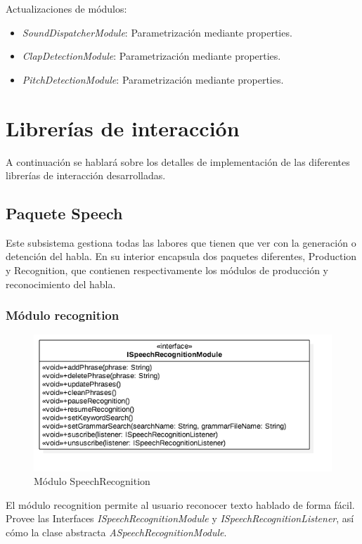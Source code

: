 Actualizaciones de módulos:

\begin{itemize}
	\item \textit{SoundDispatcherModule}: Parametrización mediante properties.
	\item \textit{ClapDetectionModule}: Parametrización mediante properties.
	\item \textit{PitchDetectionModule}: Parametrización mediante properties.

\end{itemize}

\newpage

\section{Librerías de interacción}
A continuación se hablará sobre los detalles de implementación de las diferentes librerías de interacción desarrolladas.
\label{sec:InteractionLibraries}

\subsection{Paquete Speech}
Este subsistema gestiona todas las labores que tienen que ver con la generación o detención del habla. En su interior encapsula dos paquetes diferentes, Production y Recognition, que contienen respectivamente los módulos de producción y reconocimiento del habla.

\subsubsection{Módulo recognition}
\begin{figure}
	\centering
	\includegraphics[width=0.8\linewidth]{imagenes/ISpeechRecognitionModule.png}
	\caption{Módulo SpeechRecognition}
	\label{fig:speech-recognition-module}
\end{figure}
El módulo recognition permite al usuario reconocer texto hablado de forma fácil.
Provee las Interfaces \textit{ISpeechRecognitionModule} y \textit{ISpeechRecognitionListener}, así cómo la clase abstracta \textit{ASpeechRecognitionModule}.


